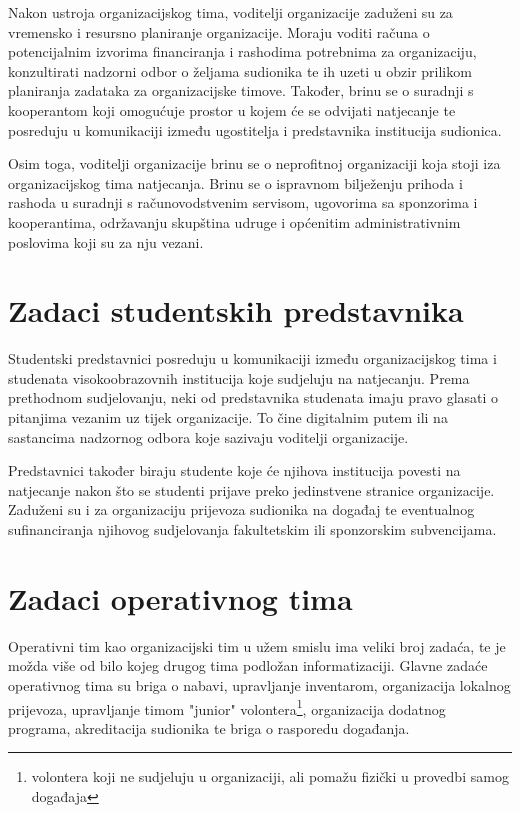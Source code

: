 \documentclass[times, utf8, diplomski]{fer}
\begin{document}
Nakon ustroja organizacijskog tima, voditelji organizacije zaduženi su za
vremensko i resursno planiranje organizacije. Moraju voditi računa o
potencijalnim izvorima financiranja i rashodima potrebnima za organizaciju,
konzultirati nadzorni odbor o željama sudionika te ih uzeti u obzir prilikom
planiranja zadataka za organizacijske timove. Također, brinu se o suradnji s
kooperantom koji omogućuje prostor u kojem će se odvijati natjecanje te
posreduju u komunikaciji između ugostitelja i predstavnika institucija
sudionica.

Osim toga, voditelji organizacije brinu se o neprofitnoj organizaciji koja stoji
iza organizacijskog tima natjecanja. Brinu se o ispravnom bilježenju prihoda i
rashoda u suradnji s računovodstvenim servisom, ugovorima sa sponzorima i
kooperantima, održavanju skupština udruge i općenitim administrativnim poslovima
koji su za nju vezani.

\section{Zadaci studentskih predstavnika} \label{nadzorni}

Studentski predstavnici posreduju u komunikaciji između organizacijskog tima i
studenata visokoobrazovnih institucija koje sudjeluju na natjecanju. Prema
prethodnom sudjelovanju, neki od predstavnika studenata imaju pravo glasati o
pitanjima vezanim uz tijek organizacije. To čine digitalnim putem ili na
sastancima nadzornog odbora koje sazivaju voditelji organizacije.

Predstavnici također biraju studente koje će njihova institucija povesti na
natjecanje nakon što se studenti prijave preko jedinstvene stranice
organizacije. Zaduženi su i za organizaciju prijevoza sudionika na događaj te
eventualnog sufinanciranja njihovog sudjelovanja fakultetskim ili sponzorskim
subvencijama.

\section{Zadaci operativnog tima}

Operativni tim kao organizacijski tim u užem smislu ima veliki broj zadaća, te
je možda više od bilo kojeg drugog tima podložan informatizaciji. Glavne zadaće
operativnog tima su briga o nabavi, upravljanje inventarom, organizacija
lokalnog prijevoza, upravljanje timom "junior" volontera\footnote{volontera koji
    ne sudjeluju u organizaciji, ali pomažu fizički u provedbi samog događaja},
    organizacija dodatnog programa, akreditacija sudionika te briga o rasporedu
    događanja.
\end{document}
